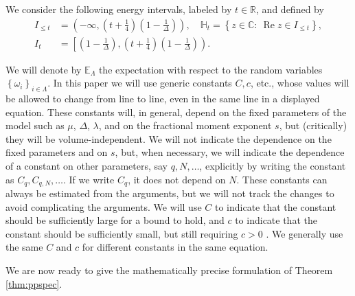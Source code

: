 \documentclass[12pt, a4paper,reqno]{amsart}
\numberwithin{equation}{section}
\DeclareMathOperator{\Rea}{Re}
\newcommand\R{\mathbb R}
\newcommand\C{\mathbb C}
\newcommand\E{\mathbb E}
\newcommand\be{\begin{equation}\begin{aligned}}
\newcommand\ee{\end{aligned}\end{equation}}
\newcommand{\set}[1]{\left\{ #1 \right\}}
\newcommand{\pa}[1]{\left( #1 \right)}
\newcommand\La{\Lambda}
\newcommand{\tfd}{\pa{1- \tfrac{1}{\Delta}}}
\begin{document}
 We consider the following  energy intervals,  labeled by $t\in\R$, and defined by
 \be\label{Im}
I_{\le t}&= \left(-\infty, (t+\tfrac 1 4)\tfd\right),\quad  \mathds{H}_t=  \set{z\in \C:\  \Rea z \in I_{\le t}},\\
 I_{t}&= \left[\tfd, (t+\tfrac 1 4)\tfd\right).
\ee 

  


 We will denote by $\E_\La$ the expectation with respect to the random variables $\set{\omega_i}_{i\in\La}$. 
In this paper  we will use generic constants $C, c$, etc., whose values will be allowed to change from line to line, even  in the same line in  a displayed equation. These constants will,  in general, depend on the  fixed parameters of the model  such as $\mu$,  $\Delta$,   $ \lambda$, and on the fractional moment exponent $s$,  but (critically) they will be volume-independent.  We will not indicate the dependence on the fixed parameters and on $s$, but, 
when necessary, we will indicate the dependence of a constant on other parameters, say $q, N, \dots$,   explicitly by writing the constant  as $C_q, C_{q,N}, \ldots$.  If we write $C_q$, it  does not depend on $N$. These constants can always be estimated from the arguments, but we will not track the changes to avoid complicating the arguments.  We  will use $C$ to indicate that the constant should be sufficiently large for a bound to hold, and $c$ to indicate that the constant should be sufficiently small,
but  still requiring $c >0$ . We generally use the same $C$ and $c$ for different constants in the same equation.


 We  are now ready to give the mathematically precise  formulation of Theorem \ref{thm:ppspec}. 
 
\end{document}
